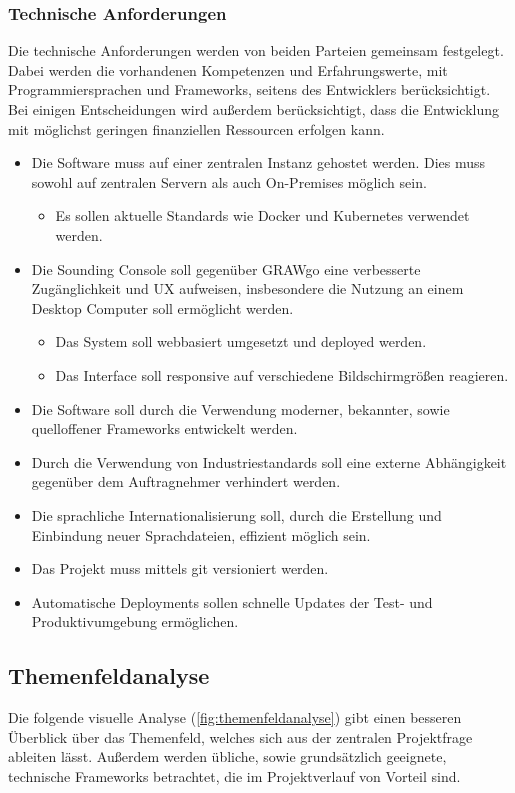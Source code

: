 \subsubsection{Technische Anforderungen}
Die technische Anforderungen werden von beiden Parteien gemeinsam festgelegt.
Dabei werden die vorhandenen Kompetenzen und Erfahrungswerte, mit Programmiersprachen und Frameworks, seitens des Entwicklers berücksichtigt.
Bei einigen Entscheidungen wird außerdem berücksichtigt, dass die Entwicklung mit möglichst geringen finanziellen Ressourcen erfolgen kann.
\begin{itemize}
    \item Die Software muss auf einer zentralen Instanz gehostet werden. Dies muss sowohl auf zentralen Servern als auch On-Premises möglich sein.
    \begin{itemize}
        \item Es sollen aktuelle Standards wie Docker und Kubernetes verwendet werden.
    \end{itemize}
    \item Die Sounding Console soll gegenüber GRAWgo eine verbesserte Zugänglichkeit und UX aufweisen, insbesondere die Nutzung an einem Desktop Computer soll ermöglicht werden.
    \begin{itemize}
        \item Das System soll webbasiert umgesetzt und deployed werden.
        \item Das Interface soll responsive auf verschiedene Bildschirmgrößen reagieren.
    \end{itemize}
    \item Die Software soll durch die Verwendung moderner, bekannter, sowie quelloffener Frameworks entwickelt werden.
    \item Durch die Verwendung von Industriestandards soll eine externe Abhängigkeit gegenüber dem Auftragnehmer verhindert werden.
    \item Die sprachliche Internationalisierung soll, durch die Erstellung und Einbindung neuer Sprachdateien, effizient möglich sein.
    \item Das Projekt muss mittels git versioniert werden.
    \item Automatische Deployments sollen schnelle Updates der Test- und Produktivumgebung ermöglichen.
\end{itemize}

\subsection{Themenfeldanalyse}
Die folgende visuelle Analyse (\ref{fig:themenfeldanalyse}) gibt einen besseren Überblick über das Themenfeld, welches sich aus der zentralen Projektfrage ableiten lässt.
Außerdem werden übliche, sowie grundsätzlich geeignete, technische Frameworks betrachtet, die im Projektverlauf von Vorteil sind.

